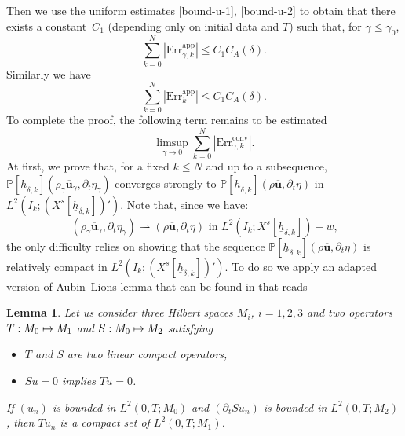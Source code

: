 \documentclass[JEP,XML,SOM,Unicode,NoFloatCountersInSection]{cedram}
\newcommand\mto{\mathchoice{\longmapsto}{\mapsto}{\mapsto}{\mapsto}}
\newcommand{\app}{\mathrm{app}}
\newcommand{\conv}{\mathrm{conv}}
\newcommand{\Err}{\mathrm{Err}}
\newtheorem{lemma}[theorem]{Lemma}
\theoremstyle{remark}
\theoremstyle{definition}
\newcommand{\ug}{\boldsymbol{u}}
\newcommand{\hb}{{\underline{h}}}
\begin{document}
Then we use the uniform estimates \eqref{bound-u-1}, \eqref{bound-u-2} to obtain that there exists a constant~$C_1$
(depending only on initial data and $T$) such that, for $\gamma \leq \gamma_0$,
\begin{equation} \label{eq_Err1}
\sum_{k=0}^N |\Err_{\gamma,k}^{\app}| \leq C_1 C_A(\delta).
\end{equation}
Similarly we have
\begin{equation} \label{eq_Err2}
\sum_{k=0}^N |\Err_{k}^{\app}| \leq C_1 C_A(\delta).
\end{equation}
To complete the proof, the following term remains to be estimated
\[
\limsup_{\gamma \to 0} \sum_{k=0}^N |\Err_{\gamma,k}^{\conv}|.
\]
At first, we prove that, for a fixed $k \leq N$ and up to a subsequence, $\mathbb{P}[\hb_{\delta, k}](\rho_{\gamma}\overline{\ug}_{\gamma},\partial_{t}\eta_{\gamma})$ converges strongly to $\mathbb{P}[\hb_{\delta, k}](\rho\overline{\ug},\partial_{t}\eta)$ in $L^{2}(I_{k};(X^{s}[\hb_{\delta, k}])')$. Note that, since we have:
\[
(\rho_{\gamma}\overline{\ug}_{\gamma},\partial_t \eta_{\gamma}) \rightharpoonup (\rho \overline{\ug},\partial_t \eta) \text{ in $L^2(I_k;X^s[\hb_{\delta, k}])-w$,}
\]
the only difficulty relies on showing that the sequence $\mathbb{P}[\hb_{\delta, k}](\rho\overline{\ug},\partial_{t}\eta)$ is relatively compact in $L^{2}(I_{k};(X^{s}[\hb_{\delta, k}])')$.
To do so we apply an adapted version of Aubin--Lions lemma that can be found in \cite[\S 4.3]{Fujita-Sauer} that reads
\begin{lemma} Let us consider three Hilbert spaces $M_i$, $i=1, 2,3 $ and two operators $T : M_0 \mto M_1$ and $S : M_0 \mto M_2$ satisfying
\begin{itemize}
\item $T$ and $S$ are two linear compact operators,
\item $Su=0$ implies $Tu=0$.
\end{itemize}
If $(u_n)$ is bounded in $L^2(0, T; M_0)$ and $(\partial_t S u_n)$ is bounded in $L^2(0, T; M_2)$, then $T u_n$ is a compact set of $L^2(0, T; M_1)$.
\end{lemma}
\end{document}
